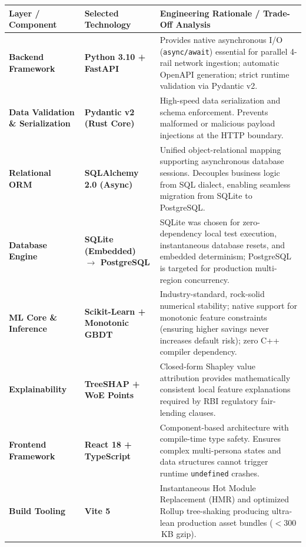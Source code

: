 \begin{table}[H]
\centering
\small
\renewcommand{\arraystretch}{1.2}
\begin{tabularx}{\textwidth}{p{2.8cm} p{3.2cm} X}
  \toprule
  \textbf{Layer / Component} & \textbf{Selected Technology} & \textbf{Engineering Rationale / Trade-Off Analysis} \\
  \midrule
  \textbf{Backend Framework} & \textbf{Python 3.10 + FastAPI} & Provides native asynchronous I/O (\texttt{async/await}) essential for parallel 4-rail network ingestion; automatic OpenAPI generation; strict runtime validation via Pydantic v2. \\
  \addlinespace
  \textbf{Data Validation \& Serialization} & \textbf{Pydantic v2 (Rust Core)} & High-speed data serialization and schema enforcement. Prevents malformed or malicious payload injections at the HTTP boundary. \\
  \addlinespace
  \textbf{Relational ORM} & \textbf{SQLAlchemy 2.0 (Async)} & Unified object-relational mapping supporting asynchronous database sessions. Decouples business logic from SQL dialect, enabling seamless migration from SQLite to PostgreSQL. \\
  \addlinespace
  \textbf{Database Engine} & \textbf{SQLite (Embedded) $\rightarrow$ PostgreSQL} & SQLite was chosen for zero-dependency local test execution, instantaneous database resets, and embedded determinism; PostgreSQL is targeted for production multi-region concurrency. \\
  \addlinespace
  \textbf{ML Core \& Inference} & \textbf{Scikit-Learn + Monotonic GBDT} & Industry-standard, rock-solid numerical stability; native support for monotonic feature constraints (ensuring higher savings never increases default risk); zero C++ compiler dependency. \\
  \addlinespace
  \textbf{Explainability} & \textbf{TreeSHAP + WoE Points} & Closed-form Shapley value attribution provides mathematically consistent local feature explanations required by RBI regulatory fair-lending clauses. \\
  \addlinespace
  \textbf{Frontend Framework} & \textbf{React 18 + TypeScript} & Component-based architecture with compile-time type safety. Ensures complex multi-persona states and data structures cannot trigger runtime \texttt{undefined} crashes. \\
  \addlinespace
  \textbf{Build Tooling} & \textbf{Vite 5} & Instantaneous Hot Module Replacement (HMR) and optimized Rollup tree-shaking producing ultra-lean production asset bundles ($<300$\,KB gzip). \\

\end{tabularx}
\end{table}
